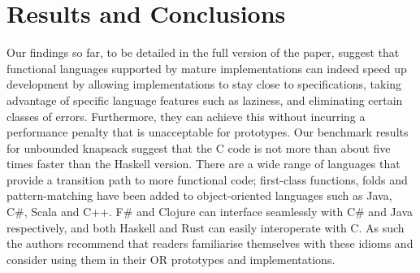 \section{Results and Conclusions}

Our findings so far, to be detailed in the full version of the paper, suggest that functional languages supported by mature
implementations can indeed speed up development by allowing implementations to
stay close to specifications, taking advantage of specific language features
such as laziness, and eliminating certain classes of errors. Furthermore, they
can achieve this without incurring
a performance penalty that is unacceptable for prototypes. Our
benchmark results for unbounded knapsack suggest that the C
code is not more than about five times faster than the Haskell version.
There are a wide range of languages that provide a transition path to more functional code; first-class functions, folds and pattern-matching have been added to object-oriented languages such as Java, C\#, Scala and C++. F\# and Clojure can interface seamlessly with C\# and Java respectively, and both Haskell and Rust can easily interoperate with C. As such the authors recommend that readers familiarise themselves with these idioms and consider using them in their OR prototypes and implementations.

